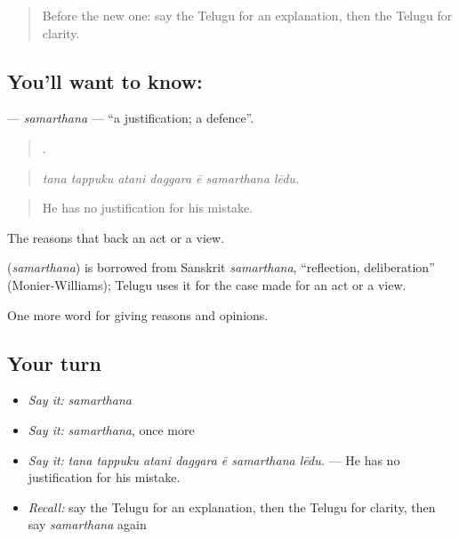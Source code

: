 \label{lesson:TE-C394-samarthana}



\begin{quote}
Before the new one: say the Telugu for an explanation, then the Telugu for clarity.
\end{quote}

\subsection*{You'll want to know: }
\textbf{} — \emph{samarthana} — \textquotedblleft{}a justification; a defence\textquotedblright{}.

\begin{quote}
      .
\end{quote}

\begin{quote}
\emph{tana tappuku atani daggara ē samarthana lēdu.}
\end{quote}

\begin{quote}
He has no justification for his mistake.
\end{quote}

The reasons that back an act or a view.

\begin{cousinweb}
\textbf{} (\emph{samarthana}) is borrowed from Sanskrit \emph{samarthana}, \textquotedblleft{}reflection, deliberation\textquotedblright{} (Monier-Williams); Telugu uses it for the case made for an act or a view.
\end{cousinweb}

\begin{grammarlens}[title={What you've built}]
One more word for giving reasons and opinions.
\end{grammarlens}

\subsection*{Your turn}
\begin{itemize}
\raggedright
  \item \emph{Say it:} \emph{samarthana}
  \item \emph{Say it:} \emph{samarthana}, once more
  \item \emph{Say it:} \emph{tana tappuku atani daggara ē samarthana lēdu.} — He has no justification for his mistake.
  \item \emph{Recall:} say the Telugu for an explanation, then the Telugu for clarity, then say \emph{samarthana} again
\end{itemize}

